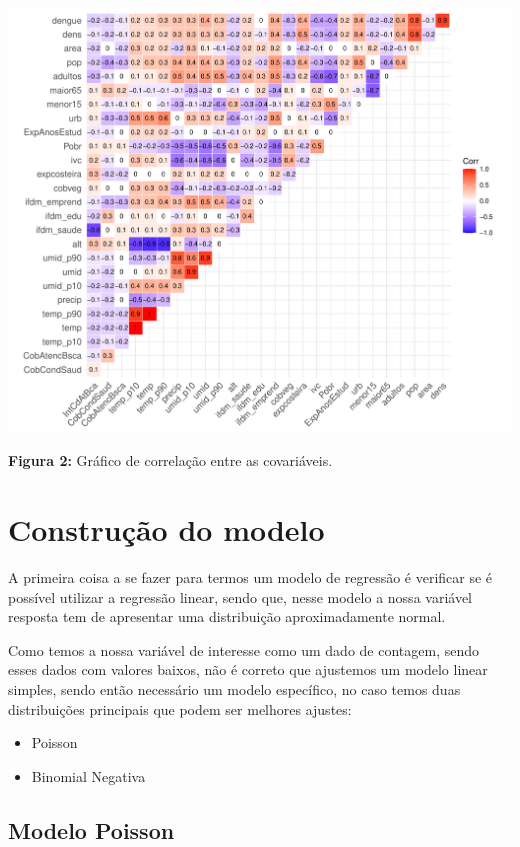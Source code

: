 \documentclass[12pt,a4paper]{article}\usepackage[]{graphicx}\usepackage[]{color}
\makeatletter
\def\maxwidth{ %
  \ifdim\Gin@nat@width>\linewidth
    \linewidth
  \else
    \Gin@nat@width
  \fi
}
\newenvironment{knitrout}{}{} %
\makeatother
\begin{document}
\begin{knitrout}
\color{fgcolor}
\includegraphics[width=\maxwidth]{figure/unnamed-chunk-4-1} 

\end{knitrout}
\textbf{Figura 2:} Gráfico de correlação entre as covariáveis.

\newpage
\section{{\LARGE\textbf{Construção do modelo}}}

A primeira coisa a se fazer para termos um modelo de regressão é verificar se é possível utilizar a regressão linear, sendo que, nesse modelo a nossa variável resposta tem de apresentar uma distribuição aproximadamente normal.

Como temos a nossa variável de interesse como um dado de contagem, sendo esses dados com valores baixos, não é correto que ajustemos um modelo linear simples, sendo então necessário um modelo específico, no caso temos duas distribuições principais que podem ser melhores ajustes:

\begin{itemize}
  \item Poisson
  \item Binomial Negativa
\end{itemize}

\subsection{\textbf{Modelo Poisson}}
\end{document}

